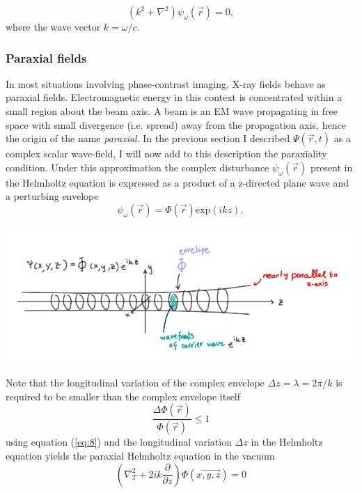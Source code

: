 \documentclass[9pt, a4paper]{article}
\newenvironment{Figure}
    {\par\medskip\noindent\minipage{\linewidth}}
    {\endminipage\par\medskip}
\begin{document}
\begin{equation}\label{eq:6}
\left ( k^2 + \nabla^{2} \right ) \psi_{\omega}(\vec{r})  
 = 0,
\end{equation}
where the wave vector $k = \omega/c$.

\subsubsection{Paraxial fields}
In most situations involving phase-contrast imaging, X-ray fields behave as paraxial fields. Electromagnetic energy in this context is concentrated within a small region about the beam axis. A beam is an EM wave propagating in free space with small divergence (i.e. spread) away from the propagation axis, hence the origin of the name \textit{paraxial}.
In the previous section I described $\Psi(\vec{r},t)$ as a complex scalar wave-field, I will now add to this description the paraxiality condition.
Under this approximation the complex disturbance $\psi_{\omega}(\vec{r})$ present in the Helmholtz equation is expressed as a product of a z-directed plane wave and a perturbing envelope\cite{PagsTutes}\cite{CH49}
\begin{equation}\label{eq:7}
\psi_{\omega}(\vec{r}) = \Phi(\vec{r})\mathrm{exp}(ikz),
\end{equation}
\begin{Figure}
\centering
\includegraphics[width=0.6\linewidth]{paraxial_beam.png}
\end{Figure}
Note that the longitudinal variation of the complex envelope $\Delta z = \lambda = 2 \pi/k$ is required to be smaller than the complex envelope itself
\begin{equation}\label{eq:8}
\frac{\Delta \Phi(\vec{r})}{\Phi(\vec{r})} \leq 1
\end{equation}
using equation (\ref{eq:8}) and the longitudinal variation $\Delta z$  in the Helmholtz equation yields the paraxial Helmholtz equation in the vacuum
\begin{equation}\label{eq:9}
\left (\nabla_{T}^{2} + 2 i k \frac{\partial }{\partial z}\right ) \Phi(\vec{x , y, z}) = 0
\end{equation}
\end{document}
